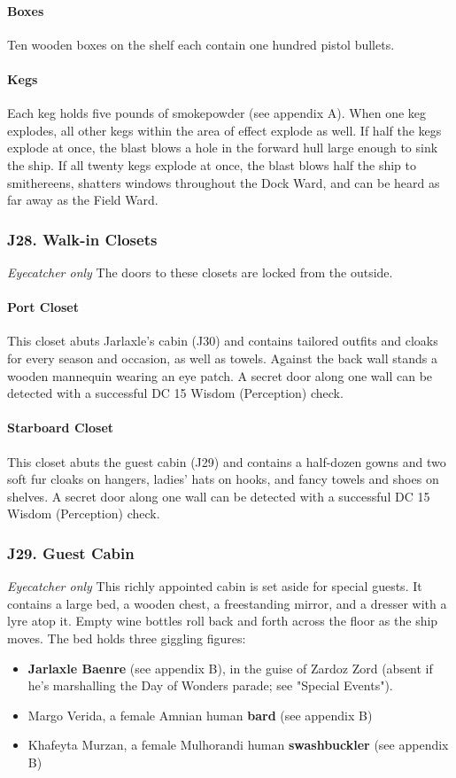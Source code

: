 \documentclass[10pt,a4paper,twoside,twocolumn,openany,nodeprecatedcode]{dndbook}
\begin{document}
\paragraph{Boxes}
Ten wooden boxes on the shelf each contain one hundred pistol bullets.
\paragraph{Kegs}
Each keg holds five pounds of smokepowder (see appendix A). When one keg explodes, all other kegs within the area of effect explode as well. If half the kegs explode at once, the blast blows a hole in the forward hull large enough to sink the ship. If all twenty kegs explode at once, the blast blows half the ship to smithereens, shatters windows throughout the Dock Ward, and can be heard as far away as the Field Ward.
\subsubsection{J28. Walk-in Closets}
\textit{Eyecatcher only}
The doors to these closets are locked from the outside.
\paragraph{Port Closet}
This closet abuts Jarlaxle's cabin (J30) and contains tailored outfits and cloaks for every season and occasion, as well as towels. Against the back wall stands a wooden mannequin wearing an eye patch. A secret door along one wall can be detected with a successful DC 15 Wisdom (Perception) check.
\paragraph{Starboard Closet}
This closet abuts the guest cabin (J29) and contains a half-dozen gowns and two soft fur cloaks on hangers, ladies' hats on hooks, and fancy towels and shoes on shelves. A secret door along one wall can be detected with a successful DC 15 Wisdom (Perception) check.
\subsubsection{J29. Guest Cabin}
\textit{Eyecatcher only}
This richly appointed cabin is set aside for special guests. It contains a large bed, a wooden chest, a freestanding mirror, and a dresser with a lyre atop it. Empty wine bottles roll back and forth across the floor as the ship moves. The bed holds three giggling figures:
\begin{itemize}

\item \textbf{Jarlaxle Baenre} (see appendix B), in the guise of Zardoz Zord (absent if he's marshalling the Day of Wonders parade; see "Special Events").
\item Margo Verida, a female Amnian human \textbf{bard} (see appendix B)
\item Khafeyta Murzan, a female Mulhorandi human \textbf{swashbuckler} (see appendix B)
\end{itemize}
\end{document}

